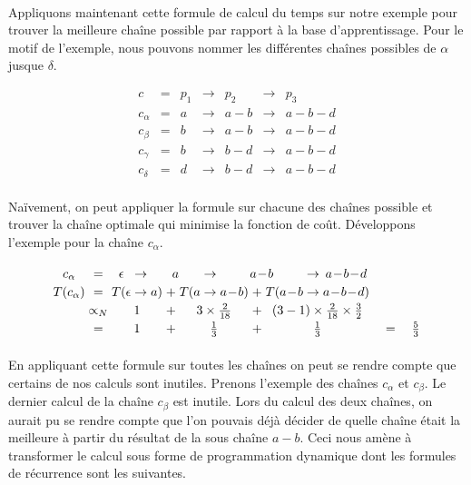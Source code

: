 \documentclass[12pt,french,twoside]{report}
\begin{document}
\paragraph{}Appliquons maintenant cette formule de calcul du temps sur notre exemple pour trouver la meilleure chaîne possible par
rapport à la base d'apprentissage. Pour le motif de l'exemple, nous pouvons nommer les différentes chaînes possibles de $\alpha$
jusque $\delta$.

\[
\begin{array}{ccccccc}
 c         & = & p_1 & \rightarrow & p_2     & \rightarrow & p_3 \\
 c_\alpha  & = & a   & \rightarrow & a\!-\!b & \rightarrow & a\!-\!b\!-\!d \\
 c_\beta   & = & b   & \rightarrow & a\!-\!b & \rightarrow & a\!-\!b\!-\!d \\
 c_\gamma  & = & b   & \rightarrow & b\!-\!d & \rightarrow & a\!-\!b\!-\!d \\
 c_\delta  & = & d   & \rightarrow & b\!-\!d & \rightarrow & a\!-\!b\!-\!d \\
\end{array}
\]

Naïvement, on peut appliquer la formule sur chacune des chaînes possible et trouver la chaîne optimale qui minimise la fonction de
coût. Développons l'exemple pour la chaîne $c_{\alpha}$.

\[
\arraycolsep=1.4pt\def\arraystretch{1.2}
\begin{array}{cccccccccccccc}
  c_\alpha    & =  & \epsilon &  \rightarrow &  \multicolumn{3}{c}{a} & \rightarrow & \multicolumn{3}{c}{a\!-\!b} &  \rightarrow & \multicolumn{1}{c}{a\!-\!b\!-\!d} &\\
  T(c_\alpha)   & =  & T( \epsilon &  \rightarrow &  a)  & + & T( a &  \rightarrow  & a\!-\!b) & + & T(a\!-\!b &  \rightarrow & a\!-\!b\!-\!d) &\\
                    & \propto_{N}  &  \multicolumn{3}{c}{1} &  + & \multicolumn{3}{c}{3 \times \frac{2}{18}} & + & \multicolumn{3}{c}{  (3-1)\times \frac{2}{18} \times \frac{3}{2}} &\\
                    & = &  \multicolumn{3}{c}{1} &  + & \multicolumn{3}{c}{\frac{1}{3}} & + & \multicolumn{3}{c}{\frac{1}{3}}   & \quad= \quad\frac{5}{3} \\

\end{array}
\]

\paragraph{}En appliquant cette formule sur toutes les chaînes on peut se rendre compte que certains de nos calculs sont inutiles.
Prenons l'exemple des chaînes $c_{\alpha}$ et $c_{\beta}$. Le dernier calcul de la chaîne $c_{\beta}$ est inutile. Lors
du calcul des deux chaînes, on aurait pu se rendre compte que l'on pouvais déjà décider de quelle chaîne était la meilleure à
partir du résultat de la sous chaîne $a-b$. Ceci nous amène à transformer le calcul sous forme de programmation dynamique dont les
formules de récurrence sont les suivantes.
\end{document}
